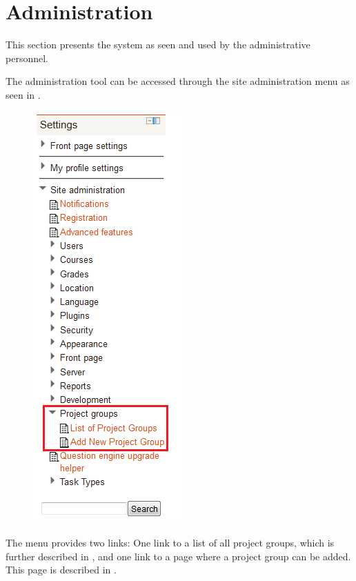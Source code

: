 \FloatBarrier
\section{Administration}
\label{sec:adminPrensentation}
This section presents the system as seen and used by the administrative personnel.

The administration tool can be accessed through the site administration menu as seen in .

\begin{figure}[htb]
	\centering
		\includegraphics[scale=0.6]{images/admin-navigation.png}
	\label{fig:navigation}
\end{figure}
The menu provides two links: One link to a list of all project groups, which is further described in , and one link to a page where a project group can be added. 
This page is described in .

\FloatBarrier

